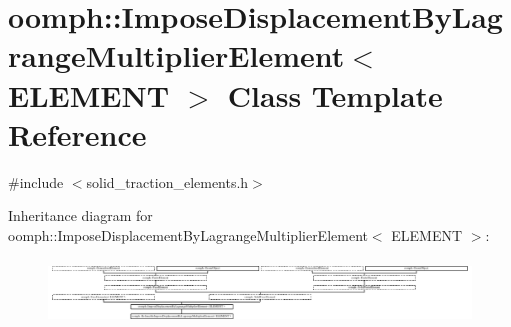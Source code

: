 \hypertarget{classoomph_1_1ImposeDisplacementByLagrangeMultiplierElement}{}\section{oomph\+:\+:Impose\+Displacement\+By\+Lagrange\+Multiplier\+Element$<$ E\+L\+E\+M\+E\+NT $>$ Class Template Reference}
\label{classoomph_1_1ImposeDisplacementByLagrangeMultiplierElement}


{\ttfamily \#include $<$solid\+\_\+traction\+\_\+elements.\+h$>$}

Inheritance diagram for oomph\+:\+:Impose\+Displacement\+By\+Lagrange\+Multiplier\+Element$<$ E\+L\+E\+M\+E\+NT $>$\+:\begin{figure}[H]
\begin{center}
\leavevmode
\includegraphics[height=1.735537cm]{classoomph_1_1ImposeDisplacementByLagrangeMultiplierElement}
\end{center}
\end{figure}
